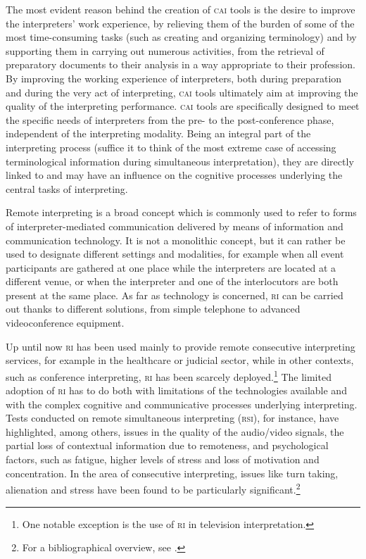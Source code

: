 \documentclass[output=paper]{langsci/langscibook}
\begin{document}
The most evident reason behind the creation of \textsc{cai} tools is the desire to improve the interpreters’ work experience, by relieving them of the burden of some of the most time-consuming tasks (such as creating and organizing terminology) and by supporting them in carrying out numerous activities, from the retrieval of preparatory documents to their analysis in a way appropriate to their profession. By improving the working experience of interpreters, both during preparation and during the very act of interpreting, \textsc{cai} tools ultimately aim at improving the quality of the interpreting performance. \textsc{cai} tools are specifically designed to meet the specific needs of interpreters from the pre- to the post-conference phase, independent of the interpreting modality. Being an integral part of the interpreting process (suffice it to think of the most extreme case of accessing terminological information during simultaneous interpretation), they are directly linked to and may have an influence on the cognitive processes underlying the central tasks of interpreting. %
 
Remote interpreting is a broad concept which is commonly used to refer to forms of interpreter-mediated communication delivered by means of information and communication technology. It is not a monolithic concept, but it can rather be used to designate different settings and modalities, for example when all event participants are gathered at one place while the interpreters are located at a different venue, or when the interpreter and one of the interlocutors are both present at the same place. As far as technology is concerned, \textsc{ri} can be carried out thanks to different solutions, from simple telephone to advanced videoconference equipment. 
 
Up until now \textsc{ri} has been used mainly to provide remote consecutive interpreting services, for example in the healthcare or judicial sector, while in other contexts, such as conference interpreting, \textsc{ri} has been scarcely deployed.\footnote{One notable exception is the use of \textsc{ri} in television interpretation.} The limited adoption of \textsc{ri} has to do both with limitations of the technologies available and with the complex cognitive and communicative processes underlying interpreting. Tests conducted on remote simultaneous interpreting (\textsc{rsi}), for instance, have highlighted, among others, issues in the quality of the audio/video signals, the partial loss of contextual information due to remoteness, and psychological factors, such as fatigue, higher levels of stress and loss of motivation and concentration. In the area of consecutive interpreting, issues like turn taking, alienation and stress have been found to be particularly significant.\footnote{For a bibliographical overview, see \citet{Andres2009}.}
 
\end{document}
